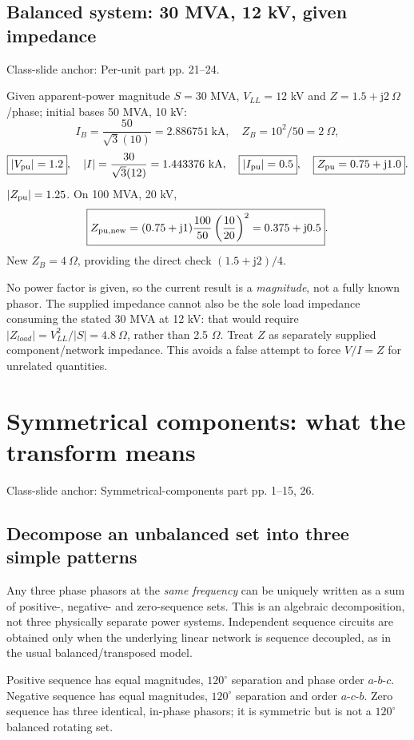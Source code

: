 \documentclass[11pt,a4paper]{article}
\newenvironment{Caution}[1]{\begin{tcolorbox}[colback=warm,colframe=rust,coltitle=white,title={#1}]}{\end{tcolorbox}}
\newcommand{\slides}[1]{{\small\color{muted}\textsf{Class-slide anchor: #1.}}\par}
\newcommand{\chapterstart}[2]{\clearpage\section{#1}\label{#2}}
\newcommand{\ans}[1]{\boxed{#1}}
\newcommand{\jj}{\mathrm j}
\begin{document}
\subsection{Balanced system: 30 MVA, 12 kV, given impedance}
\slides{Per-unit part pp. 21--24}
Given apparent-power magnitude $S=30$ MVA, $V_{LL}=12$ kV and $Z=1.5+\jj2\ \Omega$/phase; initial bases 50 MVA, 10 kV:
\[
 I_B=\frac{50}{\sqrt3(10)}=2.886751\ \mathrm{kA},\quad Z_B=10^2/50=2\ \Omega,
\]
\[
 \ans{|V_{\rm pu}|=1.2},\quad |I|=\frac{30}{\sqrt3(12)}=1.443376\ \mathrm{kA},\quad
 \ans{|I_{\rm pu}|=0.5},\quad \ans{Z_{\rm pu}=0.75+\jj1.0}.
\]
$|Z_{\rm pu}|=1.25$. On 100 MVA, 20 kV,
\[
 \ans{Z_{\rm pu,new}=(0.75+\jj1)\frac{100}{50}\left(\frac{10}{20}\right)^2
 =0.375+\jj0.5}.
\]
New $Z_B=4\ \Omega$, providing the direct check $(1.5+\jj2)/4$.
\begin{Caution}{Do not infer more than these data specify}
No power factor is given, so the current result is a \emph{magnitude}, not a fully known phasor. The supplied impedance cannot also be the sole load impedance consuming the stated 30 MVA at 12 kV: that would require $|Z_{load}|=V_{LL}^2/|S|=4.8\ \Omega$, rather than 2.5 $\Omega$. Treat $Z$ as separately supplied component/network impedance. This avoids a false attempt to force $V/I=Z$ for unrelated quantities.
\end{Caution}

\chapterstart{Symmetrical components: what the transform means}{sequence}
\slides{Symmetrical-components part pp. 1--15, 26}
\subsection{Decompose an unbalanced set into three simple patterns}
Any three phase phasors at the \emph{same frequency} can be uniquely written as a sum of positive-, negative- and zero-sequence sets. This is an algebraic decomposition, not three physically separate power systems. Independent sequence circuits are obtained only when the underlying linear network is sequence decoupled, as in the usual balanced/transposed model.

Positive sequence has equal magnitudes, $120^\circ$ separation and phase order $a$-$b$-$c$. Negative sequence has equal magnitudes, $120^\circ$ separation and order $a$-$c$-$b$. Zero sequence has three identical, in-phase phasors; it is symmetric but is not a $120^\circ$ balanced rotating set.
\begin{center}
\end{center}
\end{document}
